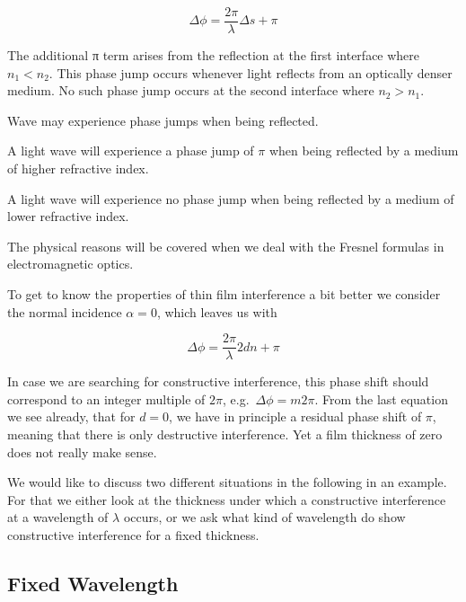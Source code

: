 \documentclass[
  a4paper,
]{book}
\begin{document}
\[
\Delta \phi=\frac{2\pi}{\lambda}\Delta s +\pi
\]

The additional π term arises from the reflection at the first interface
where \(n_1 < n_2\). This phase jump occurs whenever light reflects from
an optically denser medium. No such phase jump occurs at the second
interface where \(n_2 > n_1\).

\begin{tcolorbox}[enhanced jigsaw, coltitle=black, title=\textcolor{quarto-callout-note-color}{\faInfo}\hspace{0.5em}{Phase Jump at Boundaries}, colframe=quarto-callout-note-color-frame, toprule=.15mm, opacitybacktitle=0.6, left=2mm, opacityback=0, breakable, toptitle=1mm, bottomtitle=1mm, leftrule=.75mm, arc=.35mm, titlerule=0mm, colbacktitle=quarto-callout-note-color!10!white, rightrule=.15mm, bottomrule=.15mm, colback=white]

Wave may experience phase jumps when being reflected.

A light wave will experience a phase jump of \(\pi\) when being
reflected by a medium of higher refractive index.

A light wave will experience no phase jump when being reflected by a
medium of lower refractive index.

The physical reasons will be covered when we deal with the Fresnel
formulas in electromagnetic optics.

\end{tcolorbox}

To get to know the properties of thin film interference a bit better we
consider the normal incidence \(\alpha=0\), which leaves us with

\[
\Delta \phi=\frac{2\pi}{\lambda}2dn+\pi
\]

In case we are searching for constructive interference, this phase shift
should correspond to an integer multiple of \(2\pi\),
e.g.~\(\Delta \phi =m2\pi\). From the last equation we see already, that
for \(d=0\), we have in principle a residual phase shift of \(\pi\),
meaning that there is only destructive interference. Yet a film
thickness of zero does not really make sense.

We would like to discuss two different situations in the following in an
example. For that we either look at the thickness under which a
constructive interference at a wavelength of \(\lambda\) occurs, or we
ask what kind of wavelength do show constructive interference for a
fixed thickness.

\subsection{Fixed Wavelength}\label{fixed-wavelength}
\end{document}
